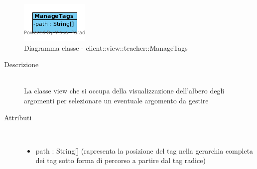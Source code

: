 \vspace{0.5cm}
\hypertarget{client::view::teacher::ManageTags}{}
\begin{center}
			\begin{figure}[H]
				\centering \includegraphics[scale=4, max width=\textwidth, max height=\myheight]{../img/diagrammiClassi/client/view/teacher/ManageTags.png}
				\caption{Diagramma classe - client::view::teacher::ManageTags}
			\end{figure}
		\end{center}\begin{description}
\item[Descrizione] \hfill \\
 La classe view che si occupa della visualizzazione dell'albero degli argomenti per selezionare un eventuale argomento da gestire
\item[Attributi] \hfill \\
 \vspace{-7mm}
\begin{itemize}
\item path : String[] (rapresenta la posizione del tag nella gerarchia completa dei tag sotto forma di percorso a partire dal tag radice)
\end{itemize}

\end{description}

